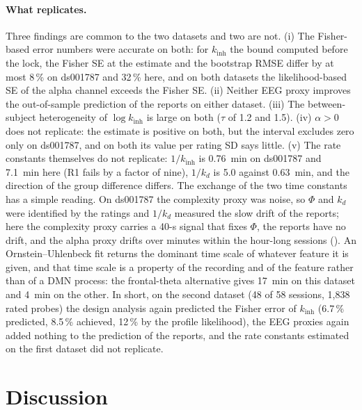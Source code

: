 \documentclass[12pt,a4paper]{article}
\theoremstyle{plain}
\theoremstyle{definition}
\theoremstyle{remark}
\newcommand{\kinh}{k_{\mathrm{inh}}}
\newcommand{\kd}{k_{d}}
\begin{document}
\paragraph{What replicates.} Three findings are common to the two datasets and two are not. (i) The Fisher-based error numbers were accurate on both: for $\kinh$ the bound computed before the lock, the Fisher SE at the estimate and the bootstrap RMSE differ by at most 8\,\% on ds001787 and 32\,\% here, and on both datasets the likelihood-based SE of the alpha channel exceeds the Fisher SE. (ii) Neither EEG proxy improves the out-of-sample prediction of the reports on either dataset. (iii) The between-subject heterogeneity of $\log\kinh$ is large on both ($\tau$ of 1.2 and 1.5). (iv) $\alpha>0$ does not replicate: the estimate is positive on both, but the interval excludes zero only on ds001787, and on both its value per rating SD says little. (v) The rate constants themselves do not replicate: $1/\kinh$ is 0.76~min on ds001787 and 7.1~min here (R1 fails by a factor of nine), $1/\kd$ is 5.0 against 0.63~min, and the direction of the group difference differs. The exchange of the two time constants has a simple reading. On ds001787 the complexity proxy was noise, so $\Phi$ and $\kd$ were identified by the ratings and $1/\kd$ measured the slow drift of the reports; here the complexity proxy carries a 40-s signal that fixes $\Phi$, the reports have no drift, and the alpha proxy drifts over minutes within the hour-long sessions (). An Ornstein--Uhlenbeck fit returns the dominant time scale of whatever feature it is given, and that time scale is a property of the recording and of the feature rather than of a DMN process: the frontal-theta alternative gives 17~min on this dataset and 4~min on the other. In short, on the second dataset (48 of 58 sessions, 1{,}838 rated probes) the design analysis again predicted the Fisher error of $\kinh$ (6.7\,\% predicted, 8.5\,\% achieved, 12\,\% by the profile likelihood), the EEG proxies again added nothing to the prediction of the reports, and the rate constants estimated on the first dataset did not replicate.

\section{Discussion}
\label{sec:discussion}
\end{document}
